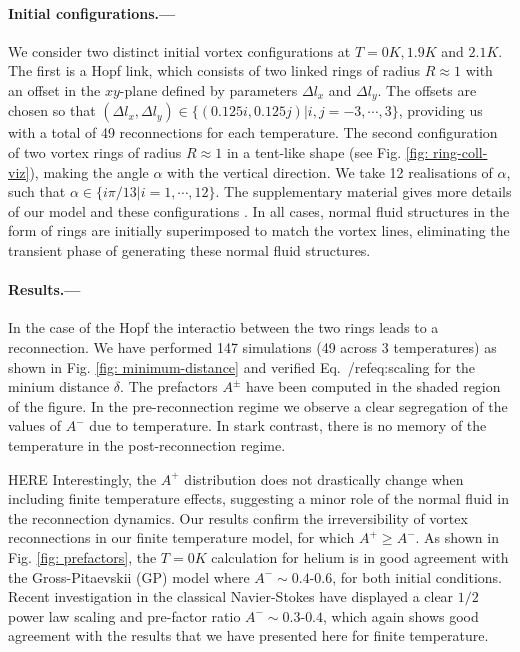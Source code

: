 \documentclass[%
 reprint,
 amsmath,amssymb,
 aps,
 prl,
]{revtex4-2}
\begin{document}
\paragraph*{Initial configurations.---}
We consider two distinct initial vortex configurations
at $T=0K,1.9K$ and $2.1K$. The first is a Hopf link, which consists
of two linked rings of radius $R\approx1$ with an offset in the $xy$-plane 
defined by parameters $\Delta l_x$ and $\Delta l_y$. 
The offsets are chosen so that 
$(\Delta l_x, \Delta l _y) \in \lbrace(0.125i,0.125j)|i,j=-3,\cdots,3 \rbrace$,
providing us with a total of 49 reconnections for each temperature. 
The second configuration of two vortex rings of radius $R\approx1$ 
in a tent-like shape (see Fig. \ref{fig: ring-coll-viz}), 
making the angle $\alpha$ with the vertical direction. 
We take 12 realisations of $\alpha$, such that 
$\alpha\in\lbrace i\pi/13|i=1,\cdots,12\rbrace$. The supplementary material 
gives more details of our model and these configurations
\cite{SeeSupplementaryMaterials}. In all cases, normal fluid structures
in the form of rings are 
initially superimposed to match the vortex lines, eliminating the transient 
phase of generating these normal fluid structures.


\paragraph*{Results.---}
In the case of the Hopf the interactio between the two rings leads
to a reconnection.  We have performed 147 simulations 
(49 across 3 temperatures) as shown in Fig. \ref{fig: minimum-distance} and
verified Eq.~/ref{eq:scaling} for the minium distance $\delta$. 
The prefactors $A^{\pm}$ have been computed in the shaded region 
of the figure. In the pre-reconnection regime we observe
a clear segregation of the values of $A^-$ due to temperature. 
In stark contrast, there is no memory of the temperature in the
post-reconnection regime. 

HERE
Interestingly, the $A^{+}$ distribution does not drastically change when including finite temperature effects, suggesting a minor role of the normal fluid in the reconnection dynamics. Our results confirm the irreversibility of vortex reconnections in our finite temperature model, for which $A^{+}\geq A^{-}$. As shown in Fig. \ref{fig: prefactors}, the $T=0K$ calculation for helium is in good agreement with the Gross-Pitaevskii (GP) model where $A^-\sim0.4$-$0.6$, for both initial conditions. Recent investigation in the classical Navier-Stokes \cite{yaoSeparationScalingViscous2020} have displayed a clear $1/2$ power law scaling and pre-factor ratio $A^-\sim0.3$-$0.4$, which again shows good agreement with the results that we have presented here for finite temperature. 
\end{document}
